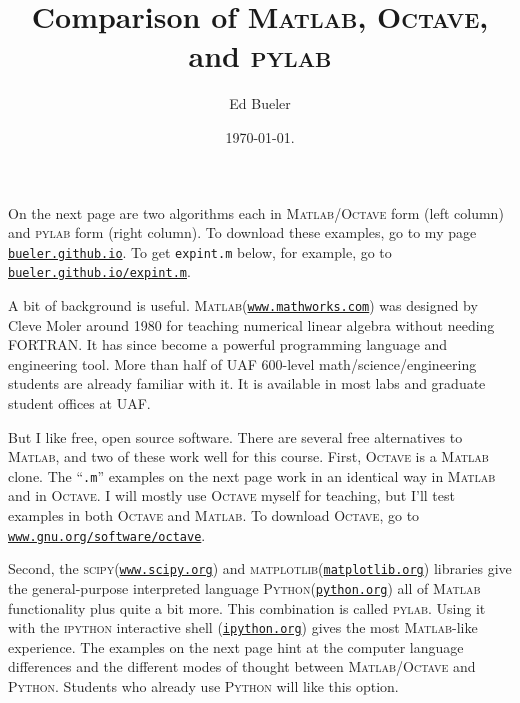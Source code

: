 \documentclass[11pt]{amsart}
\newcommand{\Matlab}{\textsc{Matlab}\xspace}
\newcommand{\Octave}{\textsc{Octave}\xspace}
\newcommand{\python}{\textsc{Python}\xspace}
\newcommand{\pylab}{\textsc{pylab}\xspace}
\newcommand{\scipy}{\textsc{scipy}\xspace}
\newcommand{\matplotlib}{\textsc{matplotlib}\xspace}
\begin{document}
\title{Comparison of \textsc{Matlab}, \textsc{Octave}, and \textsc{pylab}}

\author{Ed Bueler}

\date{\today.}

\maketitle
\normalsize
\thispagestyle{empty}

\newcommand{\hrf}[2]{\href{#1}{\texttt{#2}}}

On the next page are two algorithms each in \Matlab/\Octave form (left column) and \pylab form (right column).  To download these examples, go to my page \hrf{http://bueler.github.io}{bueler.github.io}.  To get \texttt{expint.m} below, for example, go to \hrf{http://bueler.github.io/expint.m}{bueler.github.io/expint.m}.

A bit of background is useful.  \Matlab (\hrf{http://www.mathworks.com/}{www.mathworks.com}) was designed by Cleve Moler around 1980 for teaching numerical linear algebra without needing FORTRAN.  It has since become a powerful programming language and engineering tool.  More than half of UAF 600-level math/science/engineering students are already familiar with it.  It is available in most labs and graduate student offices at UAF.

But I like free, open source software.  There are several free alternatives to \Matlab, and two of these work well for this course.  First, \Octave is a \Matlab clone.  The ``\texttt{.m}'' examples on the next page work in an identical way in \Matlab and in \Octave.  I will mostly use \Octave myself for teaching, but I'll test examples in both \Octave and \Matlab.  To download \Octave, go to 
\hrf{http://www.gnu.org/software/octave/}{www.gnu.org/software/octave}.

Second, the \scipy (\hrf{http://www.scipy.org/}{www.scipy.org}) and \matplotlib (\hrf{http://matplotlib.org/}{matplotlib.org}) libraries give the general-purpose interpreted language \python (\hrf{http://python.org/}{python.org}) all of \Matlab functionality plus quite a bit more.  This combination is called \pylab.  Using it with the \textsc{ipython} interactive shell (\hrf{http://ipython.org/}{ipython.org}) gives the most \Matlab-like experience.  The examples on the next page hint at the computer language differences and the different modes of thought between \Matlab/\Octave and \python.  Students who already use \python will like this option.
\end{document}
